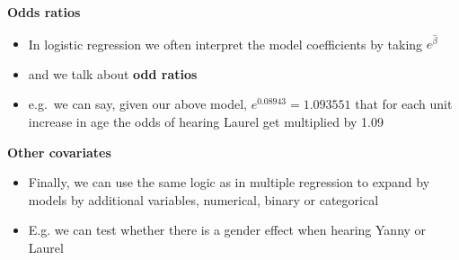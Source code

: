 \documentclass[
]{book}
\providecommand{\tightlist}{%
  \setlength{\itemsep}{0pt}\setlength{\parskip}{0pt}}
\theoremstyle{definition}
\theoremstyle{definition}
\theoremstyle{definition}
\theoremstyle{remark}
\begin{document}
\textbf{Odds ratios}

\begin{itemize}
\tightlist
\item
  In logistic regression we often interpret the model coefficients by taking \(e^{\hat{\beta}}\)
\item
  and we talk about \textbf{odd ratios}
\item
  e.g.~we can say, given our above model, \(e^{0.08943} = 1.093551\) that for each unit increase in age the odds of hearing Laurel get multiplied by 1.09
\end{itemize}

\textbf{Other covariates}

\begin{itemize}
\tightlist
\item
  Finally, we can use the same logic as in multiple regression to expand by models by additional variables, numerical, binary or categorical
\item
  E.g. we can test whether there is a gender effect when hearing Yanny or Laurel
\end{itemize}
\end{document}
